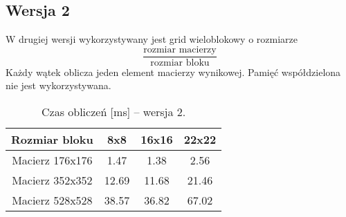 
\subsection{Wersja 2}

W drugiej wersji wykorzystywany jest grid wieloblokowy o rozmiarze $$ \frac{\text{rozmiar macierzy}}{\text{rozmiar bloku}} $$
Każdy wątek oblicza jeden element macierzy wynikowej. Pamięć współdzielona nie jest wykorzystywana.



\begin{table}[H]
\centering
\begin{tabular}{|c|c|c|c|}
\hline
Rozmiar bloku & 8x8 & 16x16 & 22x22 \\ \hline
Macierz 176x176 & 1.47 & 1.38 & 2.56 \\ \hline
Macierz 352x352 & 12.69 & 11.68 & 21.46 \\ \hline
Macierz 528x528 & 38.57 & 36.82 & 67.02 \\ \hline
\end{tabular}
\caption{Czas obliczeń [ms] -- wersja 2.}
\end{table}
